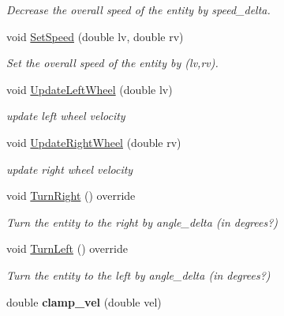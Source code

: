 \begin{DoxyCompactItemize}
\begin{DoxyCompactList}\small\item\em Decrease the overall speed of the entity by speed\+\_\+delta. \end{DoxyCompactList}\item 
void \hyperlink{classMotionHandlerRobot_a773c3d58631049e01309b82e7189779f}{Set\+Speed} (double lv, double rv)\hypertarget{classMotionHandlerRobot_a773c3d58631049e01309b82e7189779f}{}\label{classMotionHandlerRobot_a773c3d58631049e01309b82e7189779f}

\begin{DoxyCompactList}\small\item\em Set the overall speed of the entity by (lv,rv). \end{DoxyCompactList}\item 
void \hyperlink{classMotionHandlerRobot_a9df43426955f12ee824118d0a916bf5a}{Update\+Left\+Wheel} (double lv)
\begin{DoxyCompactList}\small\item\em update left wheel velocity \end{DoxyCompactList}\item 
void \hyperlink{classMotionHandlerRobot_ae33c7a7d7dcd666a595f19603335a050}{Update\+Right\+Wheel} (double rv)
\begin{DoxyCompactList}\small\item\em update right wheel velocity \end{DoxyCompactList}\item 
void \hyperlink{classMotionHandlerRobot_a4b18204b7c7f7f8a3cbb7f0e8ccf088f}{Turn\+Right} () override\hypertarget{classMotionHandlerRobot_a4b18204b7c7f7f8a3cbb7f0e8ccf088f}{}\label{classMotionHandlerRobot_a4b18204b7c7f7f8a3cbb7f0e8ccf088f}

\begin{DoxyCompactList}\small\item\em Turn the entity to the right by angle\+\_\+delta (in degrees?) \end{DoxyCompactList}\item 
void \hyperlink{classMotionHandlerRobot_a955ca2693c4188ffb08cfde469e58252}{Turn\+Left} () override\hypertarget{classMotionHandlerRobot_a955ca2693c4188ffb08cfde469e58252}{}\label{classMotionHandlerRobot_a955ca2693c4188ffb08cfde469e58252}

\begin{DoxyCompactList}\small\item\em Turn the entity to the left by angle\+\_\+delta (in degrees?) \end{DoxyCompactList}\item 
double {\bfseries clamp\+\_\+vel} (double vel)\hypertarget{classMotionHandlerRobot_a4b77aaa2de94d2b397206184adddaedd}{}\label{classMotionHandlerRobot_a4b77aaa2de94d2b397206184adddaedd}

\end{DoxyCompactItemize}
